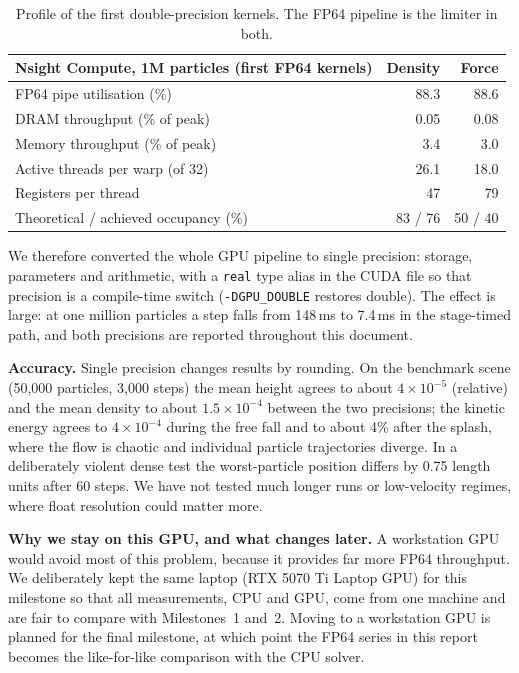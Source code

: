 \documentclass[11pt]{article}
\begin{document}
\begin{table}[H]
\centering
\begin{tabular}{lrr}
\toprule
Nsight Compute, 1M particles (first FP64 kernels) & Density & Force \\
\midrule
FP64 pipe utilisation (\%) & 88.3 & 88.6 \\
DRAM throughput (\% of peak) & 0.05 & 0.08 \\
Memory throughput (\% of peak) & 3.4 & 3.0 \\
Active threads per warp (of 32) & 26.1 & 18.0 \\
Registers per thread & 47 & 79 \\
Theoretical / achieved occupancy (\%) & 83 / 76 & 50 / 40 \\
\bottomrule
\end{tabular}
\caption{Profile of the first double-precision kernels. The FP64 pipeline is the limiter in both.}\label{tab:ncu}
\end{table}

We therefore converted the whole GPU pipeline to single precision: storage, parameters and arithmetic, with a \texttt{real} type alias in the CUDA file so that precision is a compile-time switch (\texttt{-DGPU\_DOUBLE} restores double). The effect is large: at one million particles a step falls from 148\,ms to 7.4\,ms in the stage-timed path, and both precisions are reported throughout this document.

\textbf{Accuracy.} Single precision changes results by rounding. On the benchmark scene (50,000 particles, 3,000 steps) the mean height agrees to about $4\times10^{-5}$ (relative) and the mean density to about $1.5\times10^{-4}$ between the two precisions; the kinetic energy agrees to $4\times10^{-4}$ during the free fall and to about 4\% after the splash, where the flow is chaotic and individual particle trajectories diverge. In a deliberately violent dense test the worst-particle position differs by 0.75 length units after 60 steps. We have not tested much longer runs or low-velocity regimes, where float resolution could matter more.

\textbf{Why we stay on this GPU, and what changes later.} A workstation GPU would avoid most of this problem, because it provides far more FP64 throughput. We deliberately kept the same laptop (RTX 5070 Ti Laptop GPU) for this milestone so that all measurements, CPU and GPU, come from one machine and are fair to compare with Milestones~1 and~2. Moving to a workstation GPU is planned for the final milestone, at which point the FP64 series in this report becomes the like-for-like comparison with the CPU solver.
\end{document}

